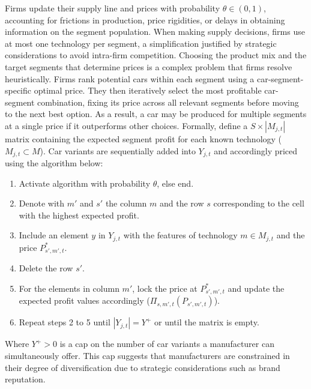 \documentclass[12pt]{article}
\begin{document}
	Firms update their supply line and prices with probability $\theta\in(0,1)$, accounting for frictions in production, price rigidities, or delays in obtaining information on the segment population. When making supply decisions, firms use at most one technology per segment, a simplification justified by strategic considerations to avoid intra-firm competition. Choosing the product mix and the target segments that determine prices is a complex problem that firms resolve heuristically. Firms rank potential cars within each segment using a car-segment-specific optimal price. They then iteratively select the most profitable car-segment combination, fixing its price across all relevant segments before moving to the next best option. As a result, a car may be produced for multiple segments at a single price if it outperforms other choices. Formally, define a ${S}\times{|M_{j,t}|}$ matrix containing the expected segment profit for each known technology ($M_{j,t}\subset M$). Car variants are sequentially added into $Y_{j,t}$ and accordingly priced using the algorithm below:
	\begin{enumerate}
		\item Activate algorithm with probability $\theta$, else end.
		\item Denote with $m'$ and $s'$ the column $m$ and the row $s$ corresponding to the cell with the highest expected profit.
		\item Include an element $y$ in $Y_{j,t}$ with the features of technology $m\in{M_{j,t}}$ and the price $P^*_{s',m',t}$.
		\item Delete the row $s'$.
		\item For the elements in column $m'$, lock the price at $P^*_{s',m',t}$ and update the expected profit values accordingly ($\Pi_{s,m',t}(P_{s',m',t})$).
		\item Repeat steps 2 to 5 until $|Y_{j,t}|=Y^+$ or until the matrix is empty.
	\end{enumerate}

	Where $Y^+>0$ is a cap on the number of car variants a manufacturer can simultaneously offer. This cap suggests that manufacturers are constrained in their degree of diversification due to strategic considerations such as brand reputation.
\end{document}
